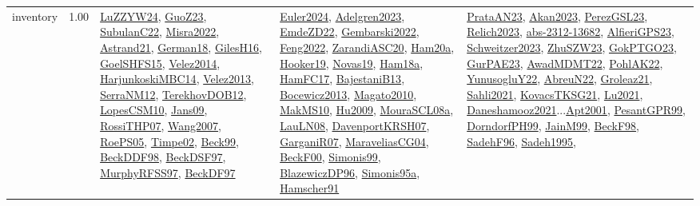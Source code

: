 {\begin{longtable}{p{3cm}r>{\raggedright\arraybackslash}p{6cm}>{\raggedright\arraybackslash}p{6cm}>{\raggedright\arraybackslash}p{8cm}}
\index{inventory}\index{Concepts!inventory}inventory &  1.00 & \hyperref[detail:LuZZYW24]{LuZZYW24}, \hyperref[detail:GuoZ23]{GuoZ23}, \hyperref[detail:SubulanC22]{SubulanC22}, \hyperref[detail:Misra2022]{Misra2022}, \hyperref[detail:Astrand21]{Astrand21}, \hyperref[detail:German18]{German18}, \hyperref[detail:GilesH16]{GilesH16}, \hyperref[detail:GoelSHFS15]{GoelSHFS15}, \hyperref[detail:Velez2014]{Velez2014}, \hyperref[detail:HarjunkoskiMBC14]{HarjunkoskiMBC14}, \hyperref[detail:Velez2013]{Velez2013}, \hyperref[detail:SerraNM12]{SerraNM12}, \hyperref[detail:TerekhovDOB12]{TerekhovDOB12}, \hyperref[detail:LopesCSM10]{LopesCSM10}, \hyperref[detail:Jans09]{Jans09}, \hyperref[detail:RossiTHP07]{RossiTHP07}, \hyperref[detail:Wang2007]{Wang2007}, \hyperref[detail:RoePS05]{RoePS05}, \hyperref[detail:Timpe02]{Timpe02}, \hyperref[detail:Beck99]{Beck99}, \hyperref[detail:BeckDDF98]{BeckDDF98}, \hyperref[detail:BeckDSF97]{BeckDSF97}, \hyperref[detail:MurphyRFSS97]{MurphyRFSS97}, \hyperref[detail:BeckDF97]{BeckDF97} & \hyperref[detail:Euler2024]{Euler2024}, \hyperref[detail:Adelgren2023]{Adelgren2023}, \hyperref[detail:EmdeZD22]{EmdeZD22}, \hyperref[detail:Gembarski2022]{Gembarski2022}, \hyperref[detail:Feng2022]{Feng2022}, \hyperref[detail:ZarandiASC20]{ZarandiASC20}, \hyperref[detail:Ham20a]{Ham20a}, \hyperref[detail:Hooker19]{Hooker19}, \hyperref[detail:Novas19]{Novas19}, \hyperref[detail:Ham18a]{Ham18a}, \hyperref[detail:HamFC17]{HamFC17}, \hyperref[detail:BajestaniB13]{BajestaniB13}, \hyperref[detail:Bocewicz2013]{Bocewicz2013}, \hyperref[detail:Magato2010]{Magato2010}, \hyperref[detail:MakMS10]{MakMS10}, \hyperref[detail:Hu2009]{Hu2009}, \hyperref[detail:MouraSCL08a]{MouraSCL08a}, \hyperref[detail:LauLN08]{LauLN08}, \hyperref[detail:DavenportKRSH07]{DavenportKRSH07}, \hyperref[detail:GarganiR07]{GarganiR07}, \hyperref[detail:MaraveliasCG04]{MaraveliasCG04}, \hyperref[detail:BeckF00]{BeckF00}, \hyperref[detail:Simonis99]{Simonis99}, \hyperref[detail:BlazewiczDP96]{BlazewiczDP96}, \hyperref[detail:Simonis95a]{Simonis95a}, \hyperref[detail:Hamscher91]{Hamscher91} & \hyperref[detail:PrataAN23]{PrataAN23}, \hyperref[detail:Akan2023]{Akan2023}, \hyperref[detail:PerezGSL23]{PerezGSL23}, \hyperref[detail:Relich2023]{Relich2023}, \hyperref[detail:abs-2312-13682]{abs-2312-13682}, \hyperref[detail:AlfieriGPS23]{AlfieriGPS23}, \hyperref[detail:Schweitzer2023]{Schweitzer2023}, \hyperref[detail:ZhuSZW23]{ZhuSZW23}, \hyperref[detail:GokPTGO23]{GokPTGO23}, \hyperref[detail:GurPAE23]{GurPAE23}, \hyperref[detail:AwadMDMT22]{AwadMDMT22}, \hyperref[detail:PohlAK22]{PohlAK22}, \hyperref[detail:YunusogluY22]{YunusogluY22}, \hyperref[detail:AbreuN22]{AbreuN22}, \hyperref[detail:Groleaz21]{Groleaz21}, \hyperref[detail:Sahli2021]{Sahli2021}, \hyperref[detail:KovacsTKSG21]{KovacsTKSG21}, \hyperref[detail:Lu2021]{Lu2021}, \hyperref[detail:Daneshamooz2021]{Daneshamooz2021}...\hyperref[detail:Apt2001]{Apt2001}, \hyperref[detail:PesantGPR99]{PesantGPR99}, \hyperref[detail:DorndorfPH99]{DorndorfPH99}, \hyperref[detail:JainM99]{JainM99}, \hyperref[detail:BeckF98]{BeckF98}, \hyperref[detail:SadehF96]{SadehF96}, \hyperref[detail:Sadeh1995]{Sadeh1995}, 
\end{longtable}}
